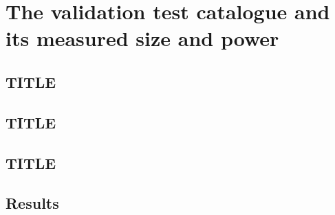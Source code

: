 \chapter{The validation test catalogue and its measured size and power}
\label{ch:validation-tests}


\section{TITLE}
\label{sec:m28}


\section{TITLE}
\label{sec:m29}


\section{TITLE}
\label{sec:m37}


\section{Results}
\label{sec:results-validation-tests}

